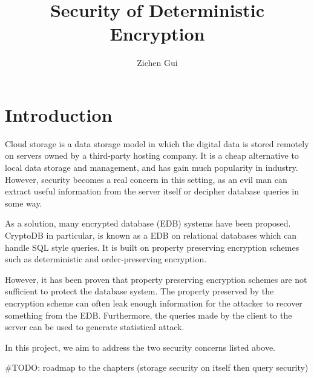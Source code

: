 \documentclass[10pt]{book}
\title{Security of Deterministic Encryption}
\author{Zichen Gui}
\begin{document}


\tableofcontents




\chapter{Introduction}
Cloud storage is a data storage model in which the digital data is stored remotely on servers owned by a third-party hosting company. It is a cheap alternative to local data storage and management, and has gain much popularity in industry. However, security becomes a real concern in this setting, as an evil man can extract useful information from the server itself or decipher database queries in some way.

As a solution, many encrypted database (EDB) systems have been proposed. CryptoDB \cite{Popa:2011:CPC:2043556.2043566} in particular, is known as a EDB on relational databases which can handle SQL style queries. It is built on property preserving encryption schemes such as deterministic and order-preserving encryption.

However, it has been proven that property preserving encryption schemes are not sufficient to protect the database system. The property preserved by the encryption scheme can often leak enough information for the attacker to recover something from the EDB. Furthermore, the queries made by the client to the server can be used to generate statistical attack.

In this project, we aim to address the two security concerns listed above.

\#TODO: roadmap to the chapters (storage security on itself then query security)
\end{document}
